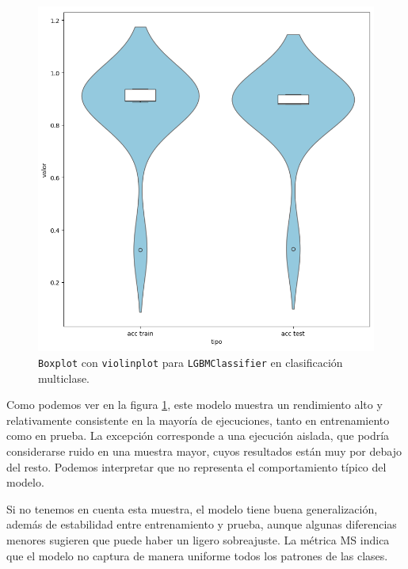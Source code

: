 \begin{figure}[H]
	\centering
	\includegraphics[width=1\linewidth]{Imagenes/lgbm_multi}
	\caption[\texttt{Boxplot} con \texttt{violinplot} para \texttt{LGBMClassifier} en clasificación multiclase]{\texttt{Boxplot} con \texttt{violinplot} para \texttt{LGBMClassifier} en clasificación multiclase.}
	\label{fig:lgbm_multi}
\end{figure}

Como podemos ver en la figura \ref{fig:lgbm_multi}, este modelo muestra un rendimiento alto y relativamente consistente en la mayoría de ejecuciones, tanto en entrenamiento como en prueba. La excepción corresponde a una ejecución aislada, que podría considerarse ruido en una muestra mayor, cuyos resultados están muy por debajo del resto. Podemos interpretar que no representa el comportamiento típico del modelo.

\vspace{1em}

Si no tenemos en cuenta esta muestra, el modelo tiene buena generalización, además de estabilidad entre entrenamiento y prueba, aunque algunas diferencias menores sugieren que puede haber un ligero sobreajuste. La métrica MS indica que el modelo no captura de manera uniforme todos los patrones de las clases.

